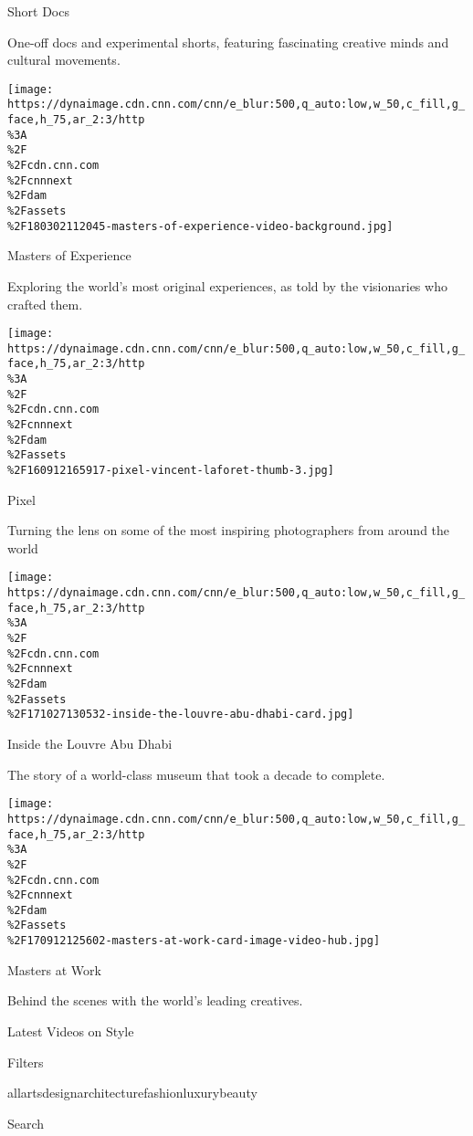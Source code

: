 Short Docs

One-off docs and experimental shorts, featuring fascinating creative
minds and cultural movements.

\href{/style/specials/masters-of-experience}{}

\texttt{[image: https://dynaimage.cdn.cnn.com/cnn/e\_blur:500,q\_auto:low,w\_50,c\_fill,g\_face,h\_75,ar\_2:3/http\\\%3A\\\%2F\\\%2Fcdn.cnn.com\\\%2Fcnnnext\\\%2Fdam\\\%2Fassets\\\%2F180302112045-masters-of-experience-video-background.jpg]}

Masters of Experience

Exploring the world's most original experiences, as told by the
visionaries who crafted them.

\href{/style/specials/pixel-series}{}

\texttt{[image: https://dynaimage.cdn.cnn.com/cnn/e\_blur:500,q\_auto:low,w\_50,c\_fill,g\_face,h\_75,ar\_2:3/http\\\%3A\\\%2F\\\%2Fcdn.cnn.com\\\%2Fcnnnext\\\%2Fdam\\\%2Fassets\\\%2F160912165917-pixel-vincent-laforet-thumb-3.jpg]}

Pixel

Turning the lens on some of the most inspiring photographers from around
the world

\href{/style/specials/louvre-abu-dhabi}{}

\texttt{[image: https://dynaimage.cdn.cnn.com/cnn/e\_blur:500,q\_auto:low,w\_50,c\_fill,g\_face,h\_75,ar\_2:3/http\\\%3A\\\%2F\\\%2Fcdn.cnn.com\\\%2Fcnnnext\\\%2Fdam\\\%2Fassets\\\%2F171027130532-inside-the-louvre-abu-dhabi-card.jpg]}

Inside the Louvre Abu Dhabi

The story of a world-class museum that took a decade to complete.

\href{/style/specials/masters-at-work}{}

\texttt{[image: https://dynaimage.cdn.cnn.com/cnn/e\_blur:500,q\_auto:low,w\_50,c\_fill,g\_face,h\_75,ar\_2:3/http\\\%3A\\\%2F\\\%2Fcdn.cnn.com\\\%2Fcnnnext\\\%2Fdam\\\%2Fassets\\\%2F170912125602-masters-at-work-card-image-video-hub.jpg]}

Masters at Work

Behind the scenes with the world's leading creatives.

Latest Videos on Style

Filters

allartsdesignarchitecturefashionluxurybeauty

Search

